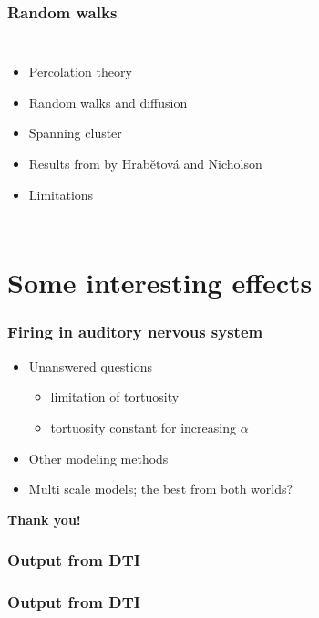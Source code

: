\documentclass{beamer}
\begin{document}
\begin{frame}
 \frametitle{Random walks}
 \begin{columns}
  \column{2.0in}
  \begin{itemize}
   \item Percolation theory
   \item Random walks and diffusion
   \item Spanning cluster
   \item Results from by Hrab\v{e}tov\'{a} and Nicholson
   \item Limitations
  \end{itemize}
\column{2.0in}

 \end{columns}
\end{frame}

\section{Some interesting effects}
\begin{frame}
 \frametitle{Firing in auditory nervous system}
  \begin{itemize}
   \item Unanswered questions 
   \begin{itemize}
    \item limitation of tortuosity
    \item tortuosity constant for increasing $\alpha$
   \end{itemize}
   \item Other modeling methods
   \item Multi scale models; the best from both worlds?
  \end{itemize}
% 
\end{frame}

\begin{frame}
\begin{center}
 \textbf{Thank you!}
\end{center}
\end{frame}

\begin{frame}
\frametitle{Output from DTI}
\end{frame}

\begin{frame}
\frametitle{Output from DTI}
\end{frame}
\end{document}
